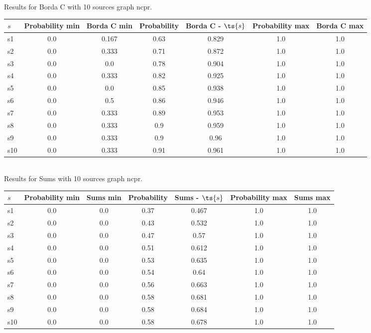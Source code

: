 \documentclass{article}
\begin{document}
\noindent Results for Borda C with 10 sources graph ncpr.

\noindent\begin{tabular}{|l|c|c|c|c|c|c|}
\hline
$s$& Probability min & Borda C min & Probability & Borda C - $\ts{s}$ & Probability max & Borda C max\\
\hline
s1 &0.0 & 0.167 & 0.63 & 0.829 & 1.0 & 1.0\\
\hline
s2 &0.0 & 0.333 & 0.71 & 0.872 & 1.0 & 1.0\\
\hline
s3 &0.0 & 0.0 & 0.78 & 0.904 & 1.0 & 1.0\\
\hline
s4 &0.0 & 0.333 & 0.82 & 0.925 & 1.0 & 1.0\\
\hline
s5 &0.0 & 0.0 & 0.85 & 0.938 & 1.0 & 1.0\\
\hline
s6 &0.0 & 0.5 & 0.86 & 0.946 & 1.0 & 1.0\\
\hline
s7 &0.0 & 0.333 & 0.89 & 0.953 & 1.0 & 1.0\\
\hline
s8 &0.0 & 0.333 & 0.9 & 0.959 & 1.0 & 1.0\\
\hline
s9 &0.0 & 0.333 & 0.9 & 0.96 & 1.0 & 1.0\\
\hline
s10 &0.0 & 0.333 & 0.91 & 0.961 & 1.0 & 1.0\\
\hline
\end{tabular}\\

\noindent Results for Sums with 10 sources graph ncpr.

\noindent\begin{tabular}{|l|c|c|c|c|c|c|}
\hline
$s$& Probability min & Sums min & Probability & Sums - $\ts{s}$ & Probability max & Sums max\\
\hline
s1 &0.0 & 0.0 & 0.37 & 0.467 & 1.0 & 1.0\\
\hline
s2 &0.0 & 0.0 & 0.43 & 0.532 & 1.0 & 1.0\\
\hline
s3 &0.0 & 0.0 & 0.47 & 0.57 & 1.0 & 1.0\\
\hline
s4 &0.0 & 0.0 & 0.51 & 0.612 & 1.0 & 1.0\\
\hline
s5 &0.0 & 0.0 & 0.53 & 0.635 & 1.0 & 1.0\\
\hline
s6 &0.0 & 0.0 & 0.54 & 0.64 & 1.0 & 1.0\\
\hline
s7 &0.0 & 0.0 & 0.56 & 0.663 & 1.0 & 1.0\\
\hline
s8 &0.0 & 0.0 & 0.58 & 0.681 & 1.0 & 1.0\\
\hline
s9 &0.0 & 0.0 & 0.58 & 0.684 & 1.0 & 1.0\\
\hline
s10 &0.0 & 0.0 & 0.58 & 0.678 & 1.0 & 1.0\\
\hline
\end{tabular}\\
\end{document}
